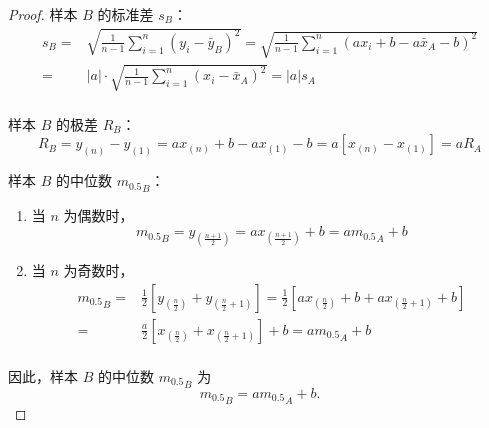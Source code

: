 \documentclass[normal,founder,mtpro2,cn]{elegantnote}
\begin{document}
\begin{enumerate}
\begin{proof}
            样本 $B$ 的标准差 $s_{B}$：
            \begin{equation*}
                \begin{aligned}
                    s_{B}=&\sqrt{\frac{1}{n-1} \sum_{i=1}^{n}\left(y_{i}-\bar{y}_{B}\right)^{2}}=\sqrt{\frac{1}{n-1} \sum_{i=1}^{n}\left(a x_{i}+b-a \bar{x}_{A}-b\right)^{2}} \\
                    =&|a| \cdot \sqrt{\frac{1}{n-1} \sum_{i=1}^{n}\left(x_{i}-\bar{x}_{A}\right)^{2}}=|a| s_{A}\\
                \end{aligned}
            \end{equation*}
    
            样本 $B$ 的极差 $R_{B}$：
            \begin{equation*}
                R_{B}=y_{(n)}-y_{(1)}=a x_{(n)}+b-a x_{(1)}-b=a\left[x_{(n)}-x_{(1)}\right]=a R_{A}
            \end{equation*}
    
            样本 $B$ 的中位数 ${m_{0.5}}_{B}$：

            \begin{enumerate}
                \item 当 $n$ 为偶数时，
                \begin{equation*}
                    {m_{0.5}}_{B}=y_{\left(\frac{n+1}{2}\right)}=a x_{\left(\frac{n+1}{2}\right)}+b=a{m_{0.5}}_{A}+b
                \end{equation*}
                \item 当 $n$ 为奇数时，
                \begin{equation*}
                    \begin{aligned}
                        {m_{0.5}}_{B}=&\frac{1}{2}\left[y_{\left(\frac{n}{2}\right)}+y_{\left(\frac{n}{2}+1\right)}\right]=\frac{1}{2}\left[a x_{\left(\frac{n}{2}\right)}+b+a x_{\left(\frac{n}{2}+1\right)}+b\right] \\
                        =&\frac{a}{2}\left[x_{\left(\frac{n}{2}\right)}+x_{\left(\frac{n}{2}+1\right)}\right]+b=a {m_{0.5}}_A+b\\
                    \end{aligned}
                \end{equation*}
            \end{enumerate}

            因此，样本 $B$ 的中位数 ${m_{0.5}}_{B}$ 为
            \begin{equation*}
                {m_{0.5}}_{B}=a{m_{0.5}}_{A}+b.
            \end{equation*}
        \end{proof}
    

\end{enumerate}
\end{document}
